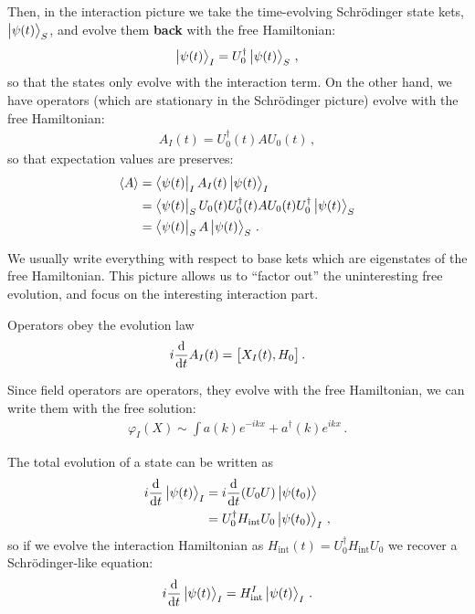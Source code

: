 \documentclass[main.tex]{subfiles}
\begin{document}
Then, in the interaction picture we take the time-evolving Schrödinger state kets, \(\ket{\psi (t)}_{S}\), and evolve them \textbf{back} with the free Hamiltonian: 
%
\begin{align}
\ket{\psi (t)}_{I} = U_0 ^\dag \ket{\psi (t)}_{S}
\,,
\end{align}
%
so that the states only evolve with the interaction term. 
On the other hand, we have operators (which are stationary in the Schrödinger picture) evolve with the free Hamiltonian:
%
\begin{align}
A_{I}(t) = U_0 ^\dag (t) A U_0 (t)
\,,
\end{align}
%
so that expectation values are preserves: 
%
\begin{align}
\expval{A} &= \bra{\psi (t)}_{I} A_I (t) \ket{\psi (t)}_{I}   \\
&= \bra{\psi (t)}_{S} U_0 (t) U_0 ^\dag(t) A U_0 (t) U_0 ^\dag \ket{\psi (t)}_{S}  \\
&=  \bra{\psi (t)}_{S} A \ket{\psi (t)}_{S}
\,.
\end{align}

We usually write everything with respect to base kets which are eigenstates of the free Hamiltonian. 
This picture allows us to ``factor out'' the uninteresting free evolution, and focus on the interesting interaction part. 

Operators obey the evolution law 
%
\begin{align}
i \dv{}{t} A_I (t) = \qty[X_I(t), H_0 ]
\,.
\end{align}

Since field operators are operators, they evolve with the free Hamiltonian, we can write them with the free solution: 
%
\begin{align}
\varphi_{I} (X) \sim \int a(k) e^{-ikx} + a ^\dag(k) e^{ikx}
\,.
\end{align}

The total evolution of a state can be written as 
%
\begin{align}
i \dv{}{t} \ket{\psi (t)}_{I} &= i \dv{}{t} \qty(U_0 U) \ket{\psi (t_0 )} \\
&= U_0 ^\dag H _{\text{int}} U_0 \ket{\psi (t_0 )}_{I}
\,,
\end{align}
%
so if we evolve the interaction Hamiltonian as \(H _{\text{int}} (t) = U_0 ^\dag H _{\text{int}} U_0 \) we recover a Schrödinger-like equation: 
%
\begin{align}
i \dv{}{t} \ket{\psi (t)}_{I} = H _{\text{int}}^{I} \ket{\psi (t)}_{I}
\,.
\end{align}
\end{document}
